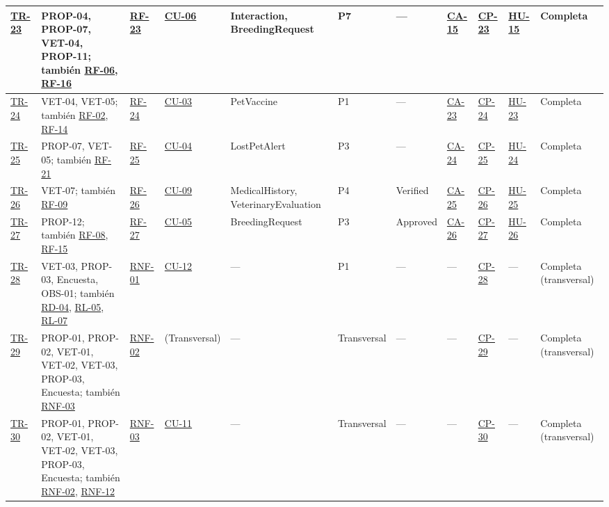 \documentclass[journal,onecolumn]{IEEEtran}
\begin{document}
\begin{landscape}
\begin{longtable}{@{}p{0.8cm} p{4.0cm} p{1.3cm} p{1.7cm} p{2.5cm} p{1.0cm} p{1.9cm} p{0.9cm} p{0.9cm} p{1.75cm} p{2.2cm}@{}}
			\hyperref[tr:23]{TR-23}\label{tr:23} & PROP-04, PROP-07, VET-04, PROP-11; también \hyperref[tab:RF-06]{RF-06}, \hyperref[tab:RF-16]{RF-16} & \hyperref[tab:RF-23]{RF-23} & \hyperref[tab:CU-06]{CU-06} & Interaction, BreedingRequest & P7 & --- & \hyperref[lst:ca15]{CA-15} & \hyperref[cp:23]{CP-23} & \hyperref[tab:HU-15]{HU-15} & Completa \\ \midrule
			\hyperref[tr:24]{TR-24}\label{tr:24} & VET-04, VET-05; también \hyperref[tab:RF-02]{RF-02}, \hyperref[tab:RF-14]{RF-14} & \hyperref[tab:RF-24]{RF-24} & \hyperref[tab:CU-03]{CU-03} & PetVaccine & P1 & --- & \hyperref[lst:ca23]{CA-23} & \hyperref[cp:24]{CP-24} & \hyperref[tab:HU-23]{HU-23} & Completa \\ \midrule
			\hyperref[tr:25]{TR-25}\label{tr:25} & PROP-07, VET-05; también \hyperref[tab:RF-21]{RF-21} & \hyperref[tab:RF-25]{RF-25} & \hyperref[tab:CU-04]{CU-04} & LostPetAlert & P3 & --- & \hyperref[lst:ca24]{CA-24} & \hyperref[cp:25]{CP-25} & \hyperref[tab:HU-24]{HU-24} & Completa \\ \midrule
			\hyperref[tr:26]{TR-26}\label{tr:26} & VET-07; también \hyperref[tab:RF-09]{RF-09} & \hyperref[tab:RF-26]{RF-26} & \hyperref[tab:CU-09]{CU-09} & MedicalHistory, VeterinaryEvaluation & P4 & Verified & \hyperref[lst:ca25]{CA-25} & \hyperref[cp:26]{CP-26} & \hyperref[tab:HU-25]{HU-25} & Completa \\ \midrule
			\hyperref[tr:27]{TR-27}\label{tr:27} & PROP-12; también \hyperref[tab:RF-08]{RF-08}, \hyperref[tab:RF-15]{RF-15} & \hyperref[tab:RF-27]{RF-27} & \hyperref[tab:CU-05]{CU-05} & BreedingRequest & P3 & Approved & \hyperref[lst:ca26]{CA-26} & \hyperref[cp:27]{CP-27} & \hyperref[tab:HU-26]{HU-26} & Completa \\ \midrule
			\hyperref[tr:28]{TR-28}\label{tr:28} & VET-03, PROP-03, Encuesta, OBS-01; también \hyperref[tab:RD-04]{RD-04}, \hyperref[rl:05]{RL-05}, \hyperref[rl:07]{RL-07} & \hyperref[tab:RNF-01]{RNF-01} & \hyperref[tab:CU-12]{CU-12} & --- & P1 & --- & --- & \hyperref[cp:28]{CP-28} & --- & Completa (transversal) \\ \midrule
			\hyperref[tr:29]{TR-29}\label{tr:29} & PROP-01, PROP-02, VET-01, VET-02, VET-03, PROP-03, Encuesta; también \hyperref[tab:RNF-03]{RNF-03} & \hyperref[tab:RNF-02]{RNF-02} & (Transversal) & --- & Transversal & --- & --- & \hyperref[cp:29]{CP-29} & --- & Completa (transversal) \\ \midrule
			\hyperref[tr:30]{TR-30}\label{tr:30} & PROP-01, PROP-02, VET-01, VET-02, VET-03, PROP-03, Encuesta; también \hyperref[tab:RNF-02]{RNF-02}, \hyperref[tab:RNF-12]{RNF-12} & \hyperref[tab:RNF-03]{RNF-03} & \hyperref[tab:CU-11]{CU-11} & --- & Transversal & --- & --- & \hyperref[cp:30]{CP-30} & --- & Completa (transversal) \\ \midrule

\end{longtable}
\end{landscape}
\end{document}

